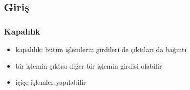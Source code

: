 \documentclass[dvipsnames]{beamer}
\theoremstyle{plain}
\begin{document}
\subsection{Giriş}

\begin{frame}
  \frametitle{Kapalılık}

  \begin{itemize}
    \item \alert{kapalılık}: bütün işlemlerin girdileri de çıktıları da bağıntı

    \medskip  
    \item bir işlemin çıktısı diğer bir işlemin girdisi olabilir
    \item içiçe işlemler yapılabilir
  \end{itemize}
\end{frame}
\end{document}
